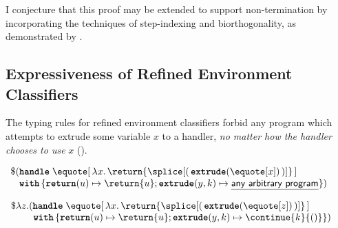 I conjecture that this proof may be extended to support non-termination by incorporating the techniques of step-indexing and biorthogonality, as demonstrated by \citet{biernacki-2017}.

\subsection{Expressiveness of Refined Environment Classifiers}\label{subsection:rec-formal-expressiveness}
The typing rules for refined environment classifiers forbid any program which attempts to extrude some variable $x$ to a handler, \textit{no matter how the handler chooses to use} $x$ ().

\begin{code}
\begin{source}
$\begin{array}{l}
  \$ (\textbf{\texttt{handle}} \; \equote[\, {\lambda x. \, \return{\splice[(\, {{\textbf{\texttt{extrude}}(\equote[x])}} \, )]}} \, ] \\
  \;\;\,\, \textbf{\texttt{with}} \, \{ \textbf{\texttt{return}}(u) \mapsto {\return{u}}; \textbf{\texttt{extrude}}(y, k) \mapsto {\underline{\textsf{any arbitrary program}}}\})
\end{array}$
\end{source}
%
\label{listing:refined-environment-classifiers-expressiveness}
\end{code}


\begin{code}
\begin{source}
$\begin{array}{l}
  \$ \lambda z. (\textbf{\texttt{handle}} \; \equote[\, {\lambda x. \, \return{\splice[( \, {{\textbf{\texttt{extrude}}(\equote[z])}} \, )]}} \,] \\
  \quad \quad \,\, \textbf{\texttt{with}} \, \{ \textbf{\texttt{return}}(u) \mapsto {\return{u}}; \textbf{\texttt{extrude}}(y, k) \mapsto {\continue{k}{()}}\})
\end{array}$
\end{source}
%
\label{listing:refined-environment-classifiers-safe}
\end{code}

